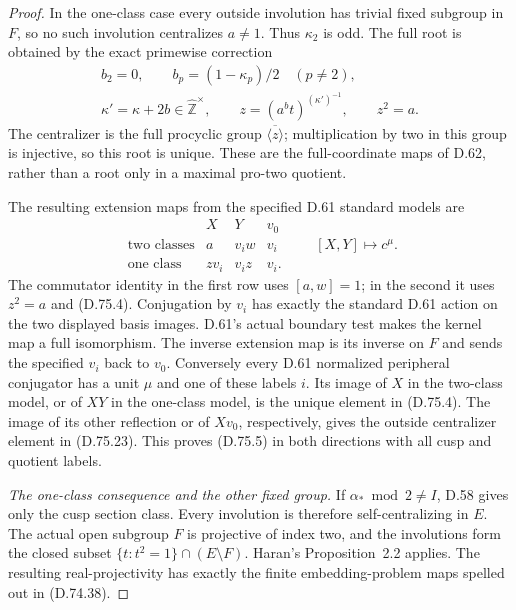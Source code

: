 \begin{proof}
In the one-class case every outside involution
has trivial fixed subgroup in $F$, so no such
involution centralizes $a\ne1$.  Thus
$\kappa_2$ is odd.  The full root is obtained
by the exact primewise correction
\[
 \begin{gathered}
 b_2=0,\qquad b_p=(1-\kappa_p)/2\quad(p\ne2),\\
 \kappa'=\kappa+2b\in\widehat{\mathbb Z}^{\times},
 \qquad z=(a^b t)^{(\kappa')^{-1}},
 \qquad z^2=a .
 \end{gathered}                                             \tag{D.75.25}
\]
The centralizer is the full procyclic group
$\overline{\langle z\rangle}$; multiplication
by two in this group is injective, so this
root is unique.  These are the full-coordinate
maps of D.62, rather than a root only in a
maximal pro-two quotient.

The resulting extension maps from the
specified D.61 standard models are
\[
 \begin{array}{c|ccc}
       &X&Y&v_0\\ \hline
 \text{two classes}&a&v_iw&v_i\\
 \text{one class}&zv_i&v_i z&v_i .
 \end{array}
 \qquad [X,Y]\longmapsto c^\mu .
                                                               \tag{D.75.26}
\]
The commutator identity in the first row
uses $[a,w]=1$; in the second it uses
$z^2=a$ and (D.75.4).  Conjugation by
$v_i$ has exactly the standard D.61 action
on the two displayed basis images.
D.61's actual boundary test makes the kernel
map a full isomorphism.  The inverse
extension map is its inverse on $F$ and
sends the specified $v_i$ back to $v_0$.
Conversely every D.61 normalized
peripheral conjugator has a unit $\mu$
and one of these labels $i$.  Its image
of $X$ in the two-class model, or of $XY$
in the one-class model, is the unique
element in (D.75.4).  The image of its
other reflection or of $Xv_0$, respectively,
gives the outside centralizer element in
(D.75.23).  This proves (D.75.5) in both
directions with all cusp and quotient labels.

\emph{The one-class consequence and the other fixed group.}
If $\alpha_*\bmod2\ne I$, D.58 gives only
the cusp section class.  Every involution
is therefore self-centralizing in $E$.
The actual open subgroup $F$ is projective
of index two, and the involutions form
the closed subset
$\{t:t^2=1\}\cap(E\setminus F)$.
Haran's Proposition~2.2
\cite{C-HaranArtinSchreier1993} applies.
The resulting real-projectivity has
exactly the finite embedding-problem maps
spelled out in (D.74.38).


\end{proof}
